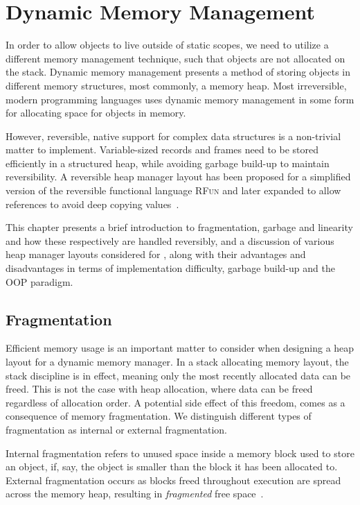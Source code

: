 \chapter{Dynamic Memory Management}
\label{chp:dynamic-memory-management}
In order to allow objects to live outside of static scopes, we need to utilize a different memory management technique, such that objects are not allocated on the stack. Dynamic memory management presents a method of storing objects in different memory structures, most commonly, a memory heap. Most irreversible, modern programming languages uses dynamic memory management in some form for allocating space for objects in memory. 

However, reversible, native support for complex data structures is a non-trivial matter to implement. Variable-sized records and frames need to be stored efficiently in a structured heap, while avoiding garbage build-up to maintain reversibility. A reversible heap manager layout has been proposed for a simplified version of the reversible functional language \textsc{RFun} and later expanded to allow references to avoid deep copying values~\cite{ha:heap, ty:rfun, tm:refcounting}.

This chapter presents a brief introduction to fragmentation, garbage and linearity and how these respectively are handled reversibly, and a discussion of various heap manager layouts considered for \rooplpp, along with their advantages and disadvantages in terms of implementation difficulty, garbage build-up and the OOP paradigm. 


\section{Fragmentation}
\label{sec:fragmentation}
Efficient memory usage is an important matter to consider when designing a heap layout for a dynamic memory manager. In a stack allocating memory layout, the stack discipline is in effect, meaning only the most recently allocated data can be freed. This is not the case with heap allocation, where data can be freed regardless of allocation order. A potential side effect of this freedom, comes as a consequence of memory fragmentation. We distinguish different types of fragmentation as internal or external fragmentation. 

Internal fragmentation refers to unused space inside a memory block used to store an object, if, say, the object is smaller than the block it has been allocated to. External fragmentation occurs as blocks freed throughout execution are spread across the memory heap, resulting in \textit{fragmented} free space~\cite{tm:languages}.

